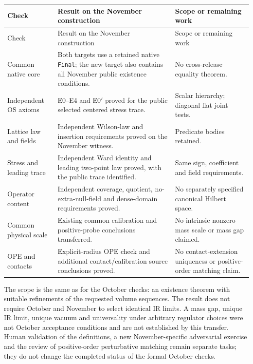 \documentclass[11pt]{article}
\newcommand{\code}[1]{{\small\nolinkurl{#1}}}
\begin{document}
\begingroup\small\setlength{\tabcolsep}{4pt}
\renewcommand{\arraystretch}{1.15}
\begin{longtable}{@{}>{\raggedright\arraybackslash}p{}>{\raggedright\arraybackslash}p{}>{\raggedright\arraybackslash}p{}@{}}
\toprule Check & Result on the November construction & Scope or remaining work\\\midrule\endfirsthead
\toprule Check & Result on the November construction & Scope or remaining work\\\midrule\endhead
Common native core & Both targets use a retained native \code{Final}; the new target also contains all November public existence conditions. & No cross-release equality theorem.\\
Independent OS axioms & E0--E4 and E0$'$ proved for the public selected centered stress trace. & Scalar hierarchy; diagonal-flat joint tests.\\
Lattice law and fields & Independent Wilson-law and insertion requirements proved on the November witness. & Predicate bodies retained.\\
Stress and leading trace & Independent Ward identity and leading two-point law proved, with the public trace identified. & Same sign, coefficient and field requirements.\\
Operator content & Independent coverage, quotient, no-extra-null-field and dense-domain requirements proved. & No separately specified canonical Hilbert space.\\
Common physical scale & Existing common calibration and positive-probe conclusions transferred. & No intrinsic nonzero mass scale or mass gap claimed.\\
OPE and contacts & Explicit-radius OPE check and additional contact/calibration source conclusions proved. & No contact-extension uniqueness or positive-order matching claim.\\
\bottomrule
\end{longtable}\endgroup

The scope is the same as for the October checks: an existence theorem with
suitable refinements of the requested volume sequences. The result does
not require October and November to select identical IR limits. A mass gap,
unique IR limit, unique vacuum and universality under arbitrary regulator
choices were not October acceptance conditions and are not established by
this transfer. Human validation of the definitions, a new November-specific
adversarial exercise and the review of positive-order perturbative matching
remain separate tasks; they do not change the completed status of the
formal October checks.
\end{document}
